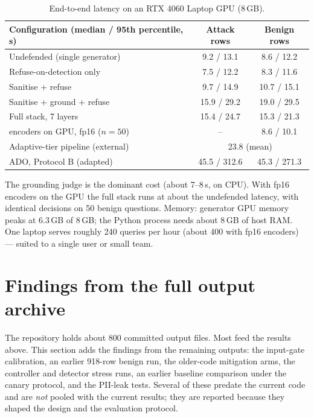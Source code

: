 \documentclass[11pt,a4paper]{article}
\begin{document}
\begin{table}[h]
\centering\small
\begin{tabular}{@{}l c c@{}}
\toprule
Configuration (median / 95th percentile, s) & Attack rows & Benign rows \\
\midrule
Undefended (single generator) & 9.2 / 13.1 & 8.6 / 12.2 \\
Refuse-on-detection only & 7.5 / 12.2 & 8.3 / 11.6 \\
Sanitise + refuse & 9.7 / 14.9 & 10.7 / 15.1 \\
Sanitise + ground + refuse & 15.9 / 29.2 & 19.0 / 29.5 \\
Full stack, 7 layers & 15.4 / 24.7 & 15.3 / 21.3 \\
\quad encoders on GPU, fp16 ($n=50$) & -- & 8.6 / 10.1 \\
Adaptive-tier pipeline (external) & \multicolumn{2}{c}{23.8 (mean)} \\
ADO, Protocol B (adapted) & 45.5 / 312.6 & 45.3 / 271.3 \\
\bottomrule
\end{tabular}
\caption{End-to-end latency on an RTX 4060 Laptop GPU (8\,GB).}
\end{table}

The grounding judge is the dominant cost (about 7--8\,s, on CPU). With fp16 encoders on the GPU the full stack runs
at about the undefended latency, with identical decisions on 50 benign questions. Memory: generator GPU memory
peaks at 6.3\,GB of 8\,GB; the Python process needs about 8\,GB of host RAM. One laptop serves roughly 240 queries
per hour (about 400 with fp16 encoders) --- suited to a single user or small team.

\section{Findings from the full output archive}\label{sec:archive}

The repository holds about 800 committed output files. Most feed the results above. This section adds the findings
from the remaining outputs: the input-gate calibration, an earlier 918-row benign run, the older-code mitigation
arms, the controller and detector stress runs, an earlier baseline comparison under the canary protocol, and the
PII-leak tests. Several of these predate the current code and are \emph{not} pooled with the current results; they
are reported because they shaped the design and the evaluation protocol.
\end{document}
